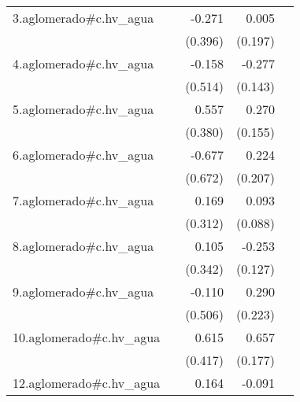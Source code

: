 {\begin{longtable}{l*{4}{D{.}{.}{-1}}}
\addlinespace
3.aglomerado#c.hv\_agua&                     &      -0.271         &       0.005         &                     \\
            &                     &     (0.396)         &     (0.197)         &                     \\
\addlinespace
4.aglomerado#c.hv\_agua&                     &      -0.158         &      -0.277         &                     \\
            &                     &     (0.514)         &     (0.143)         &                     \\
\addlinespace
5.aglomerado#c.hv\_agua&                     &       0.557         &       0.270         &                     \\
            &                     &     (0.380)         &     (0.155)         &                     \\
\addlinespace
6.aglomerado#c.hv\_agua&                     &      -0.677         &       0.224         &                     \\
            &                     &     (0.672)         &     (0.207)         &                     \\
\addlinespace
7.aglomerado#c.hv\_agua&                     &       0.169         &       0.093         &                     \\
            &                     &     (0.312)         &     (0.088)         &                     \\
\addlinespace
8.aglomerado#c.hv\_agua&                     &       0.105         &      -0.253\sym{*}  &                     \\
            &                     &     (0.342)         &     (0.127)         &                     \\
\addlinespace
9.aglomerado#c.hv\_agua&                     &      -0.110         &       0.290         &                     \\
            &                     &     (0.506)         &     (0.223)         &                     \\
\addlinespace
10.aglomerado#c.hv\_agua&                     &       0.615         &       0.657\sym{***}&                     \\
            &                     &     (0.417)         &     (0.177)         &                     \\
\addlinespace
12.aglomerado#c.hv\_agua&                     &       0.164         &      -0.091         &                     \\

\end{longtable}}

